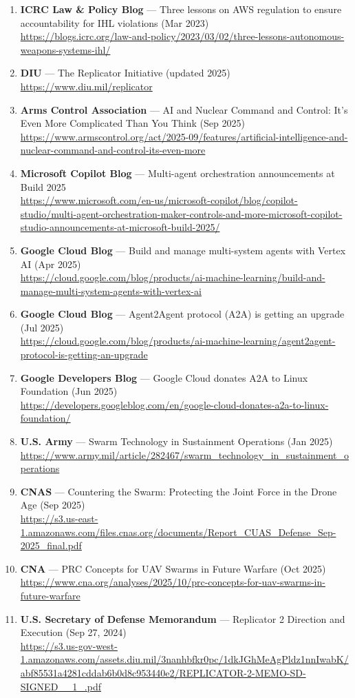 \documentclass[11pt]{article}
\begin{document}
\begin{enumerate}
\item
  \textbf{ICRC Law \& Policy Blog} --- Three lessons on AWS regulation
  to ensure accountability for IHL violations (Mar 2023)\\
  \url{https://blogs.icrc.org/law-and-policy/2023/03/02/three-lessons-autonomous-weapons-systems-ihl/}
\item
  \textbf{DIU} --- The Replicator Initiative (updated 2025)\\
  \url{https://www.diu.mil/replicator}
\item
  \textbf{Arms Control Association} --- AI and Nuclear Command and
  Control: It's Even More Complicated Than You Think (Sep 2025)\\
  \url{https://www.armscontrol.org/act/2025-09/features/artificial-intelligence-and-nuclear-command-and-control-its-even-more}
\item
  \textbf{Microsoft Copilot Blog} --- Multi-agent orchestration
  announcements at Build 2025\\
  \url{https://www.microsoft.com/en-us/microsoft-copilot/blog/copilot-studio/multi-agent-orchestration-maker-controls-and-more-microsoft-copilot-studio-announcements-at-microsoft-build-2025/}
\item
  \textbf{Google Cloud Blog} --- Build and manage multi-system agents
  with Vertex AI (Apr 2025)\\
  \url{https://cloud.google.com/blog/products/ai-machine-learning/build-and-manage-multi-system-agents-with-vertex-ai}
\item
  \textbf{Google Cloud Blog} --- Agent2Agent protocol (A2A) is getting
  an upgrade (Jul 2025)\\
  \url{https://cloud.google.com/blog/products/ai-machine-learning/agent2agent-protocol-is-getting-an-upgrade}
\item
  \textbf{Google Developers Blog} --- Google Cloud donates A2A to Linux
  Foundation (Jun 2025)\\
  \url{https://developers.googleblog.com/en/google-cloud-donates-a2a-to-linux-foundation/}
\item
  \textbf{U.S. Army} --- Swarm Technology in Sustainment Operations (Jan
  2025)\\
  \url{https://www.army.mil/article/282467/swarm_technology_in_sustainment_operations}
\item
  \textbf{CNAS} --- Countering the Swarm: Protecting the Joint Force in
  the Drone Age (Sep 2025)\\
  \url{https://s3.us-east-1.amazonaws.com/files.cnas.org/documents/Report_CUAS_Defense_Sep-2025_final.pdf}
\item
  \textbf{CNA} --- PRC Concepts for UAV Swarms in Future Warfare (Oct
  2025)\\
  \url{https://www.cna.org/analyses/2025/10/prc-concepts-for-uav-swarms-in-future-warfare}
\item
  \textbf{U.S. Secretary of Defense Memorandum} --- Replicator 2
  Direction and Execution (Sep 27, 2024)\\
  \url{https://s3.us-gov-west-1.amazonaws.com/assets.diu.mil/3nanhbfkr0pc/1dkJGhMeAgPldz1nnIwabK/abf85531a4281cddab6b0d8c953440e2/REPLICATOR-2-MEMO-SD-SIGNED__1_.pdf}
\end{enumerate}
\end{document}

